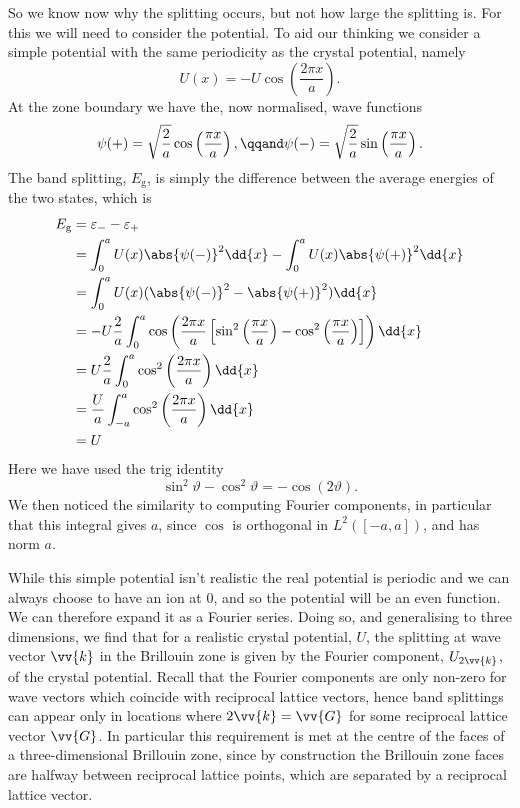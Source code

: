 \documentclass[fleqn]{NotesClass}
\newcommand*{\gap}{\mathrm{g}}
\begin{document}
    So we know now why the splitting occurs, but not how large the splitting is.
    For this we will need to consider the potential.
    To aid our thinking we consider a simple potential with the same periodicity as the crystal potential, namely
    \begin{equation}
        U(x) = -U\cos\left( \frac{2\pi x}{a} \right).
    \end{equation}
    At the zone boundary we have the, now normalised, wave functions
    \begin{equation}
        \psi(+) = \sqrt{\frac{2}{a}} \cos\left( \frac{\pi x}{a} \right), \qqand \psi(-) = \sqrt{\frac{2}{a}} \sin\left( \frac{\pi x}{a} \right).
    \end{equation}
    The band splitting, \(E_{\gap}\), is simply the difference between the average energies of the two states, which is
    \begin{align}
        E_{\gap} &= \varepsilon_{-} - \varepsilon_{+}\\
        &= \int_{0}^{a}U(x)\abs{\psi(-)}^2 \dd{x} - \int_{0}^{a} U(x) \abs{\psi(+)}^2 \dd{x}\\
        &= \int_{0}^{a} U(x) (\abs{\psi(-)}^2 - \abs{\psi(+)}^2) \dd{x}\\
        &= -U\frac{2}{a}\int_{0}^{a} \cos\left( \frac{2\pi x}{a} \left[ \sin^2\left( \frac{\pi x}{a} \right) - \cos^2\left( \frac{\pi x}{a} \right) \right] \right) \dd{x}\\
        &= U\frac{2}{a} \int_{0}^{a} \cos^2\left( \frac{2\pi x}{a} \right) \dd{x}\\
        &= \frac{U}{a} \int_{-a}^{a} \cos^2\left( \frac{2\pi x}{a} \right) \dd{x}\\
        &= U
    \end{align}
    Here we have used the trig identity
    \begin{equation}
        \sin^2\vartheta - \cos^2\vartheta = -\cos(2\vartheta).
    \end{equation}
    We then noticed the similarity to computing Fourier components, in particular that this integral gives \(a\), since \(\cos\) is orthogonal in \(L^2([-a, a])\), and has norm \(a\).
    
    While this simple potential isn't realistic the real potential is periodic and we can always choose to have an ion at 0, and so the potential will be an even function.
    We can therefore expand it as a Fourier series.
    Doing so, and generalising to three dimensions, we find that for a realistic crystal potential, \(U\), the splitting at wave vector \(\vv{k}\) in the Brillouin zone is given by the Fourier component, \(U_{2\vv{k}}\), of the crystal potential.
    Recall that the Fourier components are only non-zero for wave vectors which coincide with reciprocal lattice vectors, hence band splittings can appear only in locations where \(2\vv{k} = \vv{G}\) for some reciprocal lattice vector \(\vv{G}\).
    In particular this requirement is met at the centre of the faces of a three-dimensional Brillouin zone, since by construction the Brillouin zone faces are halfway between reciprocal lattice points, which are separated by a reciprocal lattice vector.
    
\end{document}
